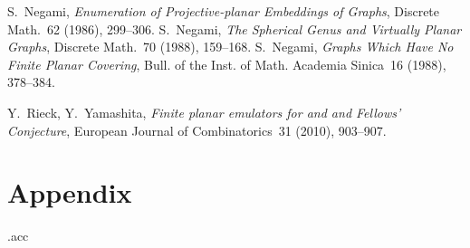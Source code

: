 \documentclass[envcountsect,envcountsame]{llncs}
\def\dotheappendixmagic{\immediate\closeout\accuwrite\jobname.acc}
\newenvironment{onlynoaccum}{}{}
\begin{document}
\begin{thebibliography}{99}
   S.~Negami, {\em Enumeration of Projective-planar Embeddings of Graphs\/},
   Discrete Math.~62 (1986), 299--306.
   S.~Negami, {\em The Spherical Genus and Virtually Planar Graphs\/},
   Discrete Math.~70 (1988), 159--168.
   S.~Negami, {\em Graphs Which Have No Finite Planar Covering\/}, 
   Bull. of the Inst. of Math. Academia Sinica~16 (1988), 378--384.



   Y.~Rieck, Y.~Yamashita, {\em Finite planar emulators for 
	and  and Fellows' Conjecture},
	European Journal of Combinatorics~31 (2010), 903--907.


\end{thebibliography}




\begin{onlynoaccum}
\newpage
\section*{\LARGE Appendix}
\def\thesection{A}

\dotheappendixmagic
\end{onlynoaccum}
\end{document}

